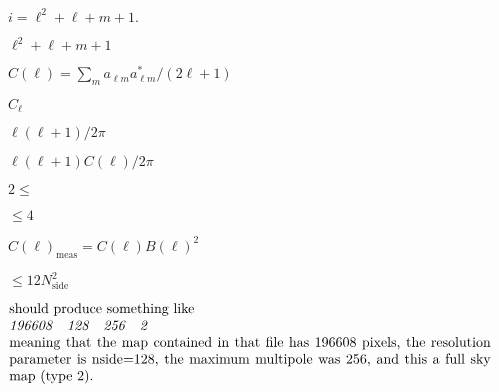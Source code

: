 \documentclass[12pt,twoside]{article}
\providecommand{\facname}{}%
\providecommand{\FACNAME}{}%
\def\lthtmlcheckvsize{\ifdim\ht\sizebox<\vsize 
  \ifdim\wd\sizebox<\hsize\expandafter\hfill\fi \expandafter\vfill
  \else\expandafter\vss\fi}%
\begin{document}
{\newpage\clearpage
{}%
$i = \ell^2 + \ell + m + 1.$%
\lthtmlindisplaymathZ
\lthtmlcheckvsize\clearpage}

{\newpage\clearpage
{}%
$\ell^2 + \ell + m + 1$%
\lthtmlindisplaymathZ
\lthtmlcheckvsize\clearpage}

{\newpage\clearpage
{}%
$C(\ell) = \sum_m a_{\ell m}a^*_{\ell m} / (2\ell+1)$%
\lthtmlindisplaymathZ
\lthtmlcheckvsize\clearpage}

{\newpage\clearpage
{}%
$C_\ell$%
\lthtmlindisplaymathZ
\lthtmlcheckvsize\clearpage}

{\newpage\clearpage
{}%
$\ell(\ell+1)/2\pi$%
\lthtmlindisplaymathZ
\lthtmlcheckvsize\clearpage}

{\newpage\clearpage
{}%
$\ell(\ell+1)C(\ell)/2\pi$%
\lthtmlindisplaymathZ
\lthtmlcheckvsize\clearpage}


\renewcommand{\facname}{{gaussbeam}}

\renewcommand{\FACNAME}{{GAUSSBEAM}}

\renewcommand{\l}{{$\ell$\  }}
{\newpage\clearpage
{}%
$2 \le$%
\lthtmlindisplaymathZ
\lthtmlcheckvsize\clearpage}

{\newpage\clearpage
{}%
$\le 4$%
\lthtmlindisplaymathZ
\lthtmlcheckvsize\clearpage}

{\newpage\clearpage
{}%
$C(\ell)_{\mathrm{meas}} = C(\ell)
B(\ell)^2$%
\lthtmlindisplaymathZ
\lthtmlcheckvsize\clearpage}


\renewcommand{\facname}{{getdisc\_ring }}

\renewcommand{\FACNAME}{{GETDISC\_RING }}

\renewcommand{\facname}{{getsize\_fits }}

\renewcommand{\FACNAME}{{GETSIZE\_FITS }}
{\newpage\clearpage
{}%
$\le 12N_{\mathrm{side}}^2$%
\lthtmlindisplaymathZ
\lthtmlcheckvsize\clearpage}

{\newpage\clearpage
{}%
$\textstyle \parbox{\hsize}{ should produce something like \\
   {\em 196608 \ \        128 \ \         256  \ \      2} \\
meaning that the map contained in that file has 196608 pixels, the resolution parameter is
nside=128, the maximum multipole was 256, and this a full sky map
(type 2).
}$%
\lthtmlindisplaymathZ
\lthtmlcheckvsize\clearpage}
\end{document}
